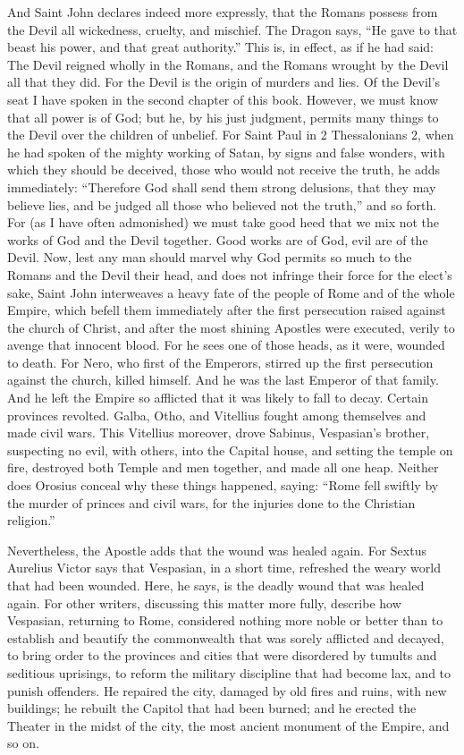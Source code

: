 And Saint John declares indeed more expressly, that the Romans possess from the Devil all wickedness, cruelty, and mischief. The Dragon says, “He gave to that beast his power, and that great authority.” This is, in effect, as if he had said: The Devil reigned wholly in the Romans, and the Romans wrought by the Devil all that they did. For the Devil is the origin of murders and lies. Of the Devil’s seat I have spoken in the second chapter of this book. However, we must know that all power is of God; but he, by his just judgment, permits many things to the Devil over the children of unbelief. For Saint Paul in 2 Thessalonians 2, when he had spoken of the mighty working of Satan, by signs and false wonders, with which they should be deceived, those who would not receive the truth, he adds immediately: “Therefore God shall send them strong delusions, that they may believe lies, and be judged all those who believed not the truth,” and so forth. For (as I have often admonished) we must take good heed that we mix not the works of God and the Devil together. Good works are of God, evil are of the Devil. Now, lest any man should marvel why God permits so much to the Romans and the Devil their head, and does not infringe their force for the elect’s sake, Saint John interweaves a heavy fate of the people of Rome and of the whole Empire, which befell them immediately after the first persecution raised against the church of Christ, and after the most shining Apostles were executed, verily to avenge that innocent blood. For he sees one of those heads, as it were, wounded to death. For Nero, who first of the Emperors, stirred up the first persecution against the church, killed himself. And he was the last Emperor of that family. And he left the Empire so afflicted that it was likely to fall to decay. Certain provinces revolted. Galba, Otho, and Vitellius fought among themselves and made civil wars. This Vitellius moreover, drove Sabinus, Vespasian’s brother, suspecting no evil, with others, into the Capital house, and setting the temple on fire, destroyed both Temple and men together, and made all one heap. Neither does Orosius conceal why these things happened, saying: “Rome fell swiftly by the murder of princes and civil wars, for the injuries done to the Christian religion.”

Nevertheless, the Apostle adds that the wound was healed again. For Sextus Aurelius Victor says that Vespasian, in a short time, refreshed the weary world that had been wounded. Here, he says, is the deadly wound that was healed again. For other writers, discussing this matter more fully, describe how Vespasian, returning to Rome, considered nothing more noble or better than to establish and beautify the commonwealth that was sorely afflicted and decayed, to bring order to the provinces and cities that were disordered by tumults and seditious uprisings, to reform the military discipline that had become lax, and to punish offenders. He repaired the city, damaged by old fires and ruins, with new buildings; he rebuilt the Capitol that had been burned; and he erected the Theater in the midst of the city, the most ancient monument of the Empire, and so on.


